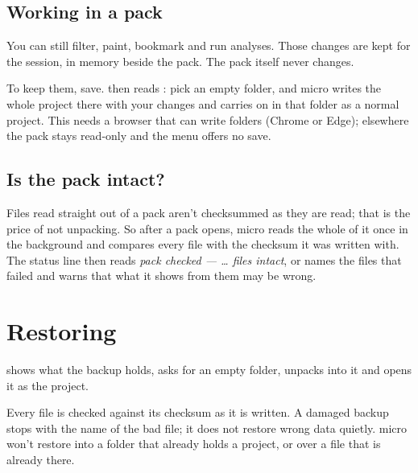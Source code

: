 \subsection{Working in a pack}
You can still filter, paint, bookmark and run analyses. Those changes are kept for the session, in memory beside the pack. The pack itself never changes.

To keep them, save.  then reads : pick an empty folder, and micro writes the whole project there with your changes and carries on in that folder as a normal project. This needs a browser that can write folders (Chrome or Edge); elsewhere the pack stays read-only and the  menu offers no save.

\subsection{Is the pack intact?}
Files read straight out of a pack aren't checksummed as they are read; that is the price of not unpacking. So after a pack opens, micro reads the whole of it once in the background and compares every file with the checksum it was written with. The status line then reads \emph{pack checked — … files intact}, or names the files that failed and warns that what it shows from them may be wrong.

\section{Restoring}\label{sec:store-restore}
 shows what the backup holds, asks for an empty folder, unpacks into it and opens it as the project.

Every file is checked against its checksum as it is written. A damaged backup stops with the name of the bad file; it does not restore wrong data quietly. micro won't restore into a folder that already holds a project, or over a file that is already there.


